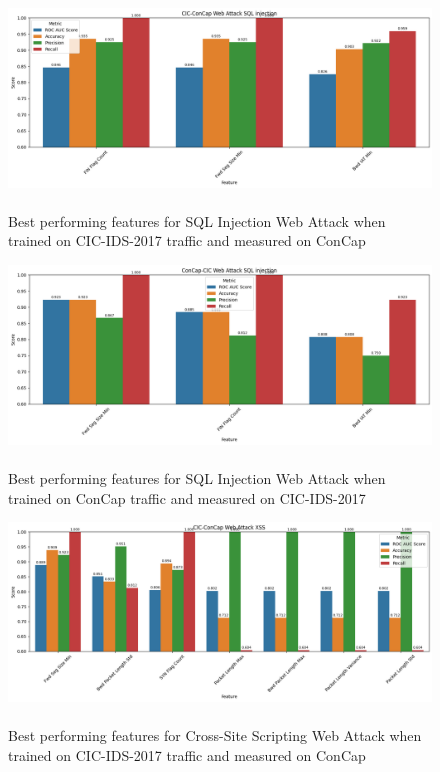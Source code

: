 \begin{figure}
	\centering
	\includegraphics[width=1.2\linewidth]{images/web_sqli_cic_concap}
	\caption{\\Best performing features for SQL Injection Web Attack when trained on CIC-IDS-2017 traffic and measured on ConCap}
	\label{fig:web_sqli_cic_concap}
\end{figure}
\begin{figure}
	\centering
	\includegraphics[width=1.2\linewidth]{images/web_sqli_concap_cic}
	\caption{\\Best performing features for SQL Injection Web Attack when trained on ConCap traffic and measured on CIC-IDS-2017}
	\label{fig:web_sqli_concap_cic}
\end{figure}
\begin{figure}
	\centering
	\includegraphics[width=1.2\linewidth]{images/web_xss_cic_concap}
	\caption{\\Best performing features for Cross-Site Scripting Web Attack when trained on CIC-IDS-2017 traffic and measured on ConCap}
	\label{fig:web_xss_cic_concap}
\end{figure}
